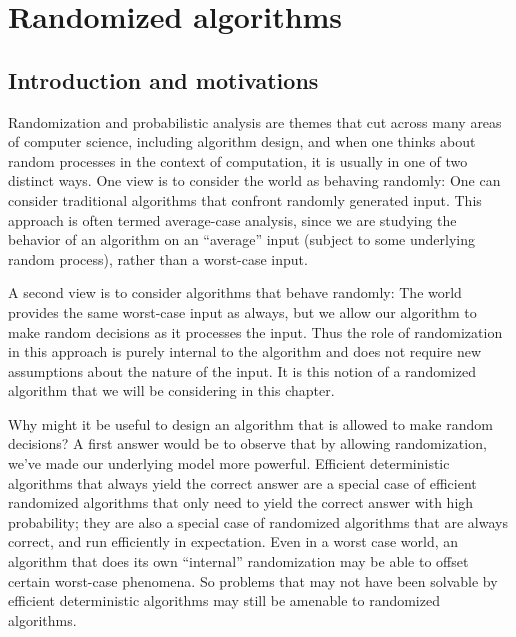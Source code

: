 \section{Randomized algorithms}
\subsection{Introduction and motivations}
Randomization and probabilistic analysis are themes that cut across many areas of computer science, including algorithm design, and when one thinks about random processes in the context of computation, it is usually in one of two distinct ways. One view is to consider the world as behaving randomly: One can consider traditional algorithms that confront randomly generated input. This approach is often termed average-case analysis, since we are studying the behavior of an algorithm on an “average” input (subject to some underlying random process), rather than a worst-case input. 

A second view is to consider algorithms that behave randomly: The world provides the same worst-case input as always, but we allow our algorithm to make random decisions as it processes the input. Thus the role of randomization in this approach is purely internal to the algorithm and does not require new assumptions about the nature of the input. It is this notion of a randomized algorithm that we will be considering in this chapter.

Why might it be useful to design an algorithm that is allowed to make random decisions? A first answer would be to observe that by allowing randomization, we’ve made our underlying model more powerful. Efficient deterministic algorithms that always yield the correct answer are a special case of efficient randomized algorithms that only need to yield the correct answer with high probability; they are also a special case of randomized algorithms that are always correct, and run efficiently in expectation. Even in a worst case world, an algorithm that does its own “internal” randomization may be able to offset certain worst-case phenomena. So problems that may not have been solvable by efficient deterministic algorithms may still be amenable to randomized algorithms.

